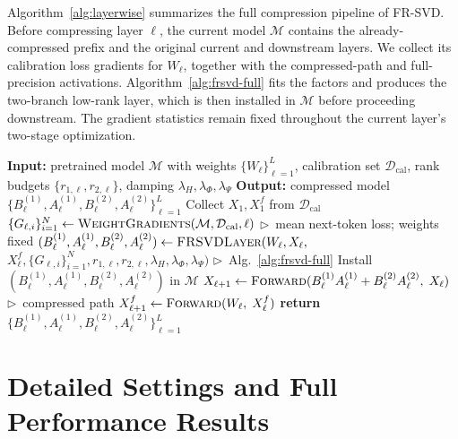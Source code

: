 Algorithm~\ref{alg:layerwise} summarizes the full compression pipeline of FR-SVD. Before compressing layer $\ell$, the current model $\mathcal M$ contains the already-compressed prefix and the original current and downstream layers. We collect its calibration loss gradients for $W_\ell$, together with the compressed-path and full-precision activations. Algorithm~\ref{alg:frsvd-full} fits the factors and produces the two-branch low-rank layer, which is then installed in $\mathcal M$ before proceeding downstream. The gradient statistics remain fixed throughout the current layer's two-stage optimization.

\begin{algorithm*}[t]
\caption{FR-SVD: full compression pipeline}
\label{alg:layerwise}
\small
\begin{algorithmic}[1]
\State \textbf{Input:}\; pretrained model $\mathcal M$ with weights $\{W_\ell\}_{\ell=1}^{L}$,
\Statex \hspace{3.2em} calibration set $\mathcal D_{\mathrm{cal}}$,
\Statex \hspace{3.2em} rank budgets $\{r_{1,\ell}, r_{2,\ell}\}$, damping $\lambda_H, \lambda_\Phi, \lambda_\Psi$
\State \textbf{Output:}\; compressed model $\{B_\ell^{(1)}, A_\ell^{(1)}, B_\ell^{(2)}, A_\ell^{(2)}\}_{\ell=1}^{L}$
\State Collect $X_1, X_1^f$ from $\mathcal{D}_{\mathrm{cal}}$ 
    \State $\{G_{\ell,i}\}_{i=1}^N \gets \Call{WeightGradients}{\mathcal M,\mathcal D_{\mathrm{cal}},\ell}$
    \Statex \hfill $\triangleright$~mean next-token loss; weights fixed
    \State $(B_\ell^{(1)}, A_\ell^{(1)}, B_\ell^{(2)}, A_\ell^{(2)}) \gets \textsc{FRSVDLayer}(W_\ell, X_\ell,$
    \Statex \hspace{3.2em}$X_\ell^f,\{G_{\ell,i}\}_{i=1}^N,r_{1,\ell},r_{2,\ell},\lambda_H,\lambda_\Phi,\lambda_\Psi)$
    \Statex \hfill $\triangleright$~Alg.~\ref{alg:frsvd-full}
    \State Install $(B_\ell^{(1)},A_\ell^{(1)},B_\ell^{(2)},A_\ell^{(2)})$ in $\mathcal M$
    \State $X_{\ell+1} \gets \Call{Forward}{B_\ell^{(1)}A_\ell^{(1)} + B_\ell^{(2)}A_\ell^{(2)},\; X_\ell}$
    \Statex \hfill $\triangleright$~compressed path
    \State $X_{\ell+1}^f \gets \Call{Forward}{W_\ell,\; X_\ell^f}$ 
\EndFor
\State \textbf{return} $\{B_\ell^{(1)}, A_\ell^{(1)}, B_\ell^{(2)}, A_\ell^{(2)}\}_{\ell=1}^{L}$
\end{algorithmic}
\end{algorithm*}

\section{Detailed Settings and Full Performance Results}\label{app:full-results}

